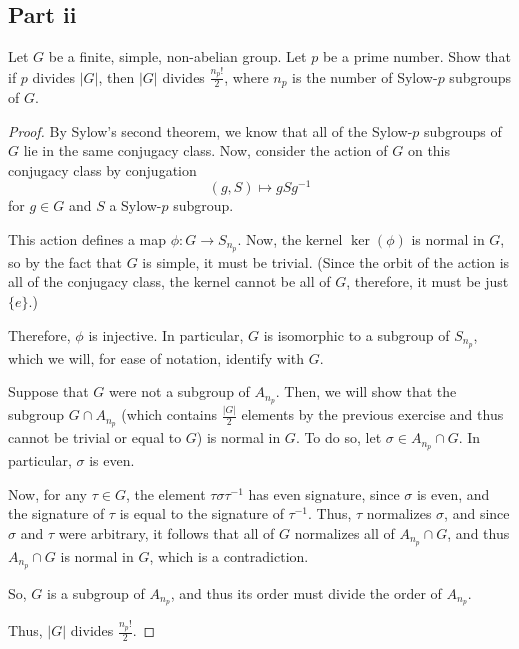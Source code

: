 \documentclass[12pt,reqno]{amsart}
\newcommand{\inv}{^{-1}}
\begin{document}
\subsection*{Part ii}
Let $G$ be a finite, simple, non-abelian group. Let $p$ be a prime number. Show
that if $p$ divides $|G|$, then $|G|$ divides $\frac{n_p!}{2}$, where $n_p$ is
the number of Sylow-$p$ subgroups of $G$.
\\
\begin{proof}
By Sylow's second theorem, we know that all of the Sylow-$p$ subgroups of $G$
    lie in the same conjugacy class. Now, consider the action of $G$ on this
    conjugacy class by conjugation
    \[
        (g,S)\mapsto gSg\inv
    \]
    for $g\in G$ and $S$ a Sylow-$p$ subgroup.

    This action defines a map $\phi:G\to S_{n_p}$.
    Now, the kernel $\ker(\phi)$ is normal in $G$, so by the fact that $G$ is
    simple, it must be trivial. (Since the orbit of the action is all of the
    conjugacy class, the kernel cannot be all of $G$, therefore, it must be just
    $\{e\}$.)

    Therefore, $\phi$ is injective. In particular, $G$ is isomorphic to a
    subgroup of $S_{n_p}$, which we will, for ease of notation, identify with
    $G$.
    
    Suppose that $G$ were not a subgroup of $A_{n_p}$. Then, we will show that
    the subgroup $G\cap A_{n_p}$ (which contains $\frac{|G|}{2}$ elements by the
    previous exercise and thus cannot be trivial or equal to $G$) is normal in
    $G$. To do so, let $\sigma\in A_{n_p}\cap G$. In particular, $\sigma$ is
    even.
    
    Now, for any $\tau\in G$, the element $\tau\sigma\tau\inv$ has even
    signature, since $\sigma$ is even, and the signature of $\tau$ is equal to
    the signature of $\tau\inv$. Thus, $\tau$ normalizes $\sigma$, and since
    $\sigma$ and $\tau$ were arbitrary, it follows that all of $G$ normalizes
    all of $A_{n_p}\cap G$, and thus $A_{n_p}\cap G$ is normal in $G$, which is 
    a contradiction.

    So, $G$ is a subgroup of $A_{n_p}$, and thus its order must divide the order
    of $A_{n_p}$.

    Thus, $|G|$ divides $\frac{n_p!}{2}$.
\end{proof}
\end{document}
